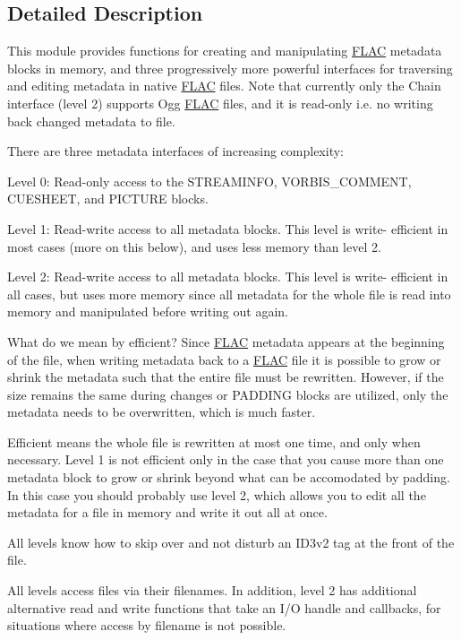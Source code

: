 \subsection{Detailed Description}
This module provides functions for creating and manipulating \hyperlink{namespace_f_l_a_c}{F\+L\+AC} metadata blocks in memory, and three progressively more powerful interfaces for traversing and editing metadata in native \hyperlink{namespace_f_l_a_c}{F\+L\+AC} files. Note that currently only the Chain interface (level 2) supports Ogg \hyperlink{namespace_f_l_a_c}{F\+L\+AC} files, and it is read-\/only i.\+e. no writing back changed metadata to file. 

There are three metadata interfaces of increasing complexity\+:

Level 0\+: Read-\/only access to the S\+T\+R\+E\+A\+M\+I\+N\+FO, V\+O\+R\+B\+I\+S\+\_\+\+C\+O\+M\+M\+E\+NT, C\+U\+E\+S\+H\+E\+ET, and P\+I\+C\+T\+U\+RE blocks.

Level 1\+: Read-\/write access to all metadata blocks. This level is write-\/ efficient in most cases (more on this below), and uses less memory than level 2.

Level 2\+: Read-\/write access to all metadata blocks. This level is write-\/ efficient in all cases, but uses more memory since all metadata for the whole file is read into memory and manipulated before writing out again.

What do we mean by efficient? Since \hyperlink{namespace_f_l_a_c}{F\+L\+AC} metadata appears at the beginning of the file, when writing metadata back to a \hyperlink{namespace_f_l_a_c}{F\+L\+AC} file it is possible to grow or shrink the metadata such that the entire file must be rewritten. However, if the size remains the same during changes or P\+A\+D\+D\+I\+NG blocks are utilized, only the metadata needs to be overwritten, which is much faster.

Efficient means the whole file is rewritten at most one time, and only when necessary. Level 1 is not efficient only in the case that you cause more than one metadata block to grow or shrink beyond what can be accomodated by padding. In this case you should probably use level 2, which allows you to edit all the metadata for a file in memory and write it out all at once.

All levels know how to skip over and not disturb an I\+D3v2 tag at the front of the file.

All levels access files via their filenames. In addition, level 2 has additional alternative read and write functions that take an I/O handle and callbacks, for situations where access by filename is not possible.

